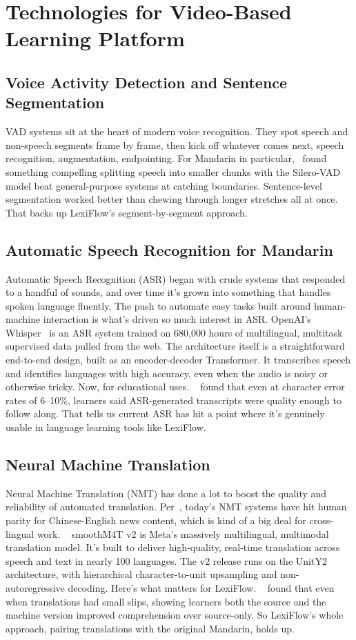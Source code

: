 \section{Technologies for Video-Based Learning Platform}
\subsection{Voice Activity Detection and Sentence Segmentation}VAD systems sit at the heart of modern voice recognition. They spot speech and non-speech segments frame by frame, then kick off whatever comes next, speech recognition, augmentation, endpointing. For Mandarin in particular,~\citet{pan2025} found something compelling splitting speech into smaller chunks with the Silero-VAD~\citep{sileroVAD} model beat general-purpose systems at catching boundaries. Sentence-level segmentation worked better than chewing through longer stretches all at once. That backs up LexiFlow's segment-by-segment approach.
\subsection{Automatic Speech Recognition for Mandarin}Automatic Speech Recognition (ASR) began with crude systems that responded to a handful of sounds, and over time it's grown into something that handles spoken language fluently. The push to automate easy tasks built around human-machine interaction is what's driven so much interest in ASR. OpenAI's Whisper~\citep{radford2023robust} is an ASR system trained on 680,000 hours of multilingual, multitask supervised data pulled from the web. The architecture itself is a straightforward end-to-end design, built as an encoder-decoder Transformer. It transcribes speech and identifies languages with high accuracy, even when the audio is noisy or otherwise tricky. Now, for educational uses. ~\citet{sutomo2024} found that even at character error rates of 6--10\%, learners said ASR-generated transcripts were quality enough to follow along. That tells us current ASR has hit a point where it's genuinely usable in language learning tools like LexiFlow.
\subsection{Neural Machine Translation}Neural Machine Translation (NMT) has done a lot to boost the quality and reliability of automated translation. Per~\citet{hassan2018}, today's NMT systems have hit human parity for Chinese-English news content, which is kind of a big deal for cross-lingual work. ~\citet{barrault2023seamless} smoothM4T v2 is Meta's massively multilingual, multimodal translation model. It's built to deliver high-quality, real-time translation across speech and text in nearly 100 languages. The v2 release runs on the UnitY2 architecture, with hierarchical character-to-unit upsampling and non-autoregressive decoding. Here's what matters for LexiFlow. ~\citet{gary2024} found that even when translations had small slips, showing learners both the source and the machine version improved comprehension over source-only. So LexiFlow's whole approach, pairing translations with the original Mandarin, holds up.
